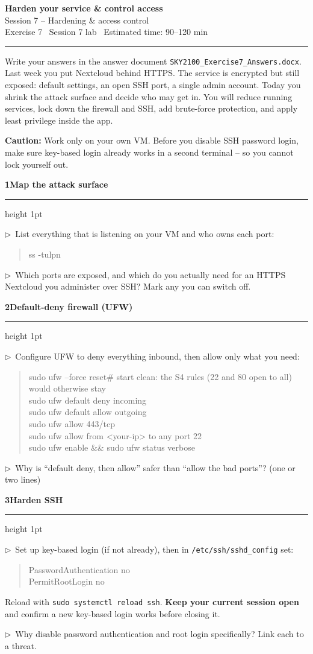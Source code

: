 \documentclass[11pt]{article}
\newcommand{\wbsection}[1]{\par\vspace{11pt}\noindent
  {\large\bfseries\color{kred}#1}\par\vspace{2pt}
  {\color{kred!35}\hrule height 1pt}\par\vspace{6pt}}
\newcommand{\task}[1]{\par\vspace{4pt}\noindent
  \textcolor{kred}{\textbf{$\triangleright$}}~#1\par\vspace{2pt}}
\renewcommand{\emph}[1]{\textup{#1}}
\newcommand{\cmd}[1]{\texttt{#1}}
\begin{document}
\begin{center}
  {\LARGE\bfseries Harden your service \& control access}\\[3pt]
  {\large Session 7 -- Hardening \& access control}\\[5pt]
  {\small Exercise 7 \textperiodcentered\ Session 7 lab \textperiodcentered\ Estimated time: 90--120 min}
\end{center}
\vspace{2pt}\hrule\vspace{1.1em}

Write your answers in the answer document \cmd{SKY2100\_Exercise7\_Answers.docx}. Last week you put Nextcloud behind HTTPS. The service is
encrypted but still exposed: default settings, an open SSH port, a single admin account. Today you
\emph{shrink the attack surface} and decide \emph{who} may get in. You will reduce running services,
lock down the firewall and SSH, add brute-force protection, and apply least privilege inside the app.

\noindent\textbf{Caution:} Work only on your \emph{own} VM. Before you disable SSH password login,
make sure key-based login already works in a second terminal -- so you cannot lock yourself out.

\wbsection{1\quad Map the attack surface}
\task{List everything that is listening on your VM and who owns each port:}
\begin{quote}\ttfamily
ss -tulpn
\end{quote}
\task{Which ports are exposed, and which do you actually need for an HTTPS Nextcloud you administer
over SSH? Mark any you can switch off.}

\wbsection{2\quad Default-deny firewall (UFW)}
\task{Configure UFW to deny everything inbound, then allow only what you need:}
\begin{quote}\ttfamily
sudo ufw --force reset\hfill\# start clean: the S4 rules (22 and 80 open to all) would otherwise stay\\
sudo ufw default deny incoming\\
sudo ufw default allow outgoing\\
sudo ufw allow 443/tcp\\
sudo ufw allow from <your-ip> to any port 22\\
sudo ufw enable \&\& sudo ufw status verbose
\end{quote}
\task{Why is ``default deny, then allow'' safer than ``allow the bad ports''? (one or two lines)}

\wbsection{3\quad Harden SSH}
\task{Set up key-based login (if not already), then in \cmd{/etc/ssh/sshd\_config} set:}
\begin{quote}\ttfamily
PasswordAuthentication no\\
PermitRootLogin no
\end{quote}
Reload with \cmd{sudo systemctl reload ssh}. \textbf{Keep your current session open} and confirm a new
key-based login works before closing it.
\task{Why disable password authentication and root login specifically? Link each to a threat.}
\end{document}
